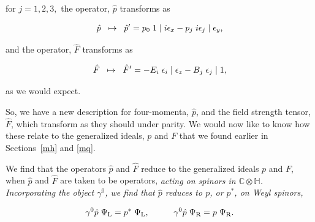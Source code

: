 \documentclass[letterpaper,12pt,titlepage,oneside,final]{book}
\newcommand{\CH}{\mathbb{C}\otimes\mathbb{H}}
\begin{document}
\noindent for $j = 1,2,3,$ the operator, $\hat{p}$ transforms as 

\begin{equation}\hat{p}\hspace{2mm}\mapsto\hspace{2mm} \hat{p}' = p_0 \hspace{1mm}1\hspace{1mm}|\hspace{1mm}i\epsilon_x - p_j\hspace{1mm} i\epsilon_j \hspace{1mm}| \hspace{1mm}\epsilon_y,
\end{equation}

\noindent and the operator, $\hat{F}$ transforms as

\begin{equation} \hat{F}\hspace{2mm}\mapsto\hspace{2mm} \hat{F}' = -E_i\hspace{1mm}\epsilon_{i} \hspace{1mm}|\hspace{1mm} \epsilon_z - B_j\hspace{1mm} \epsilon_j\hspace{1mm}|\hspace{1mm}1,
\end{equation}

\noindent as we would expect.

So, we  have a new description for four-momenta, $\hat{p}$, and the field strength tensor, $\hat{F}$, which transform as they should under parity.  We would now like to know how these relate to the generalized ideals, $p$ and $F$ that we found earlier in Sections~\ref{mh} and \ref{mq}.  


We find that the operators $\hat{p}$ and $\hat{F}$ reduce to the generalized ideals $p$ and $F$, when $\hat{p}$ and $\hat{F}$ are taken to be operators, \it acting on spinors \rm in $\CH$.  Incorporating the object $\gamma^0$, we find that $\hat{p}$ reduces to $p$, or $p^*$, on Weyl spinors,

\begin{equation} \gamma^0 \hat{p} \hspace{1mm}\Psi_{\textup{L}} = p^*\hspace{1mm}\Psi_{\textup{L}}, \hspace{1cm}  \gamma^0 \hat{p} \hspace{1mm}\Psi_{\textup{R}} = p\hspace{1mm}\Psi_{\textup{R}}.
\end{equation}
\end{document}
